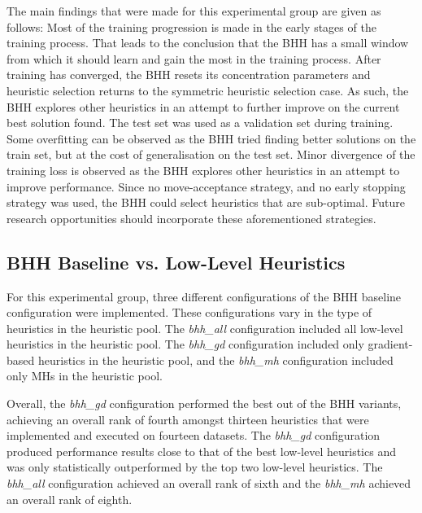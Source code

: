 The main findings that were made for this experimental group are given as follows: Most of the training progression is made in the early stages of the training process. That leads to the conclusion that the \acs{BHH} has a small window from which it should learn and gain the most in the training process. After training has converged, the \acs{BHH} resets its concentration parameters and heuristic selection returns to the symmetric heuristic selection case. As such, the \acs{BHH} explores other heuristics in an attempt to further improve on the current best solution found. The test set was used as a validation set during training. Some overfitting can be observed as the \acs{BHH} tried finding better solutions on the train set, but at the cost of generalisation on the test set. Minor divergence of the training loss is observed as the \acs{BHH} explores other heuristics in an attempt to improve performance. Since no move-acceptance strategy, and no early stopping strategy was used, the \acs{BHH} could select heuristics that are sub-optimal. Future research opportunities should incorporate these aforementioned strategies.


\subsection{\acs{BHH} Baseline vs. Low-Level Heuristics}
\label{sec:conclusion:results:summary:standalone}

For this experimental group, three different configurations of the \acs{BHH} baseline configuration were implemented. These configurations vary in the type of heuristics in the heuristic pool. The \textit{bhh\_all} configuration included all low-level heuristics in the heuristic pool. The \textit{bhh\_gd} configuration included only gradient-based heuristics in the heuristic pool, and the \textit{bhh\_mh} configuration included only \acp{MH} in the heuristic pool.

Overall, the \textit{bhh\_gd} configuration performed the best out of the \acs{BHH} variants, achieving an overall rank of fourth amongst thirteen heuristics that were implemented and executed on fourteen datasets. The \textit{bhh\_gd} configuration produced performance results close to that of the best low-level heuristics and was only statistically outperformed by the top two low-level heuristics. The \textit{bhh\_all} configuration achieved an overall rank of sixth and the \textit{bhh\_mh} achieved an overall rank of eighth.

